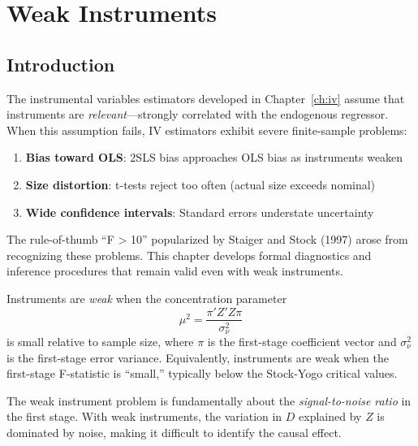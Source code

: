 
\chapter{Weak Instruments}
\label{ch:weak_iv}

\section{Introduction}
\label{sec:weak_iv_intro}

The instrumental variables estimators developed in Chapter~\ref{ch:iv} assume that instruments are \emph{relevant}---strongly correlated with the endogenous regressor. When this assumption fails, IV estimators exhibit severe finite-sample problems:

\begin{enumerate}
    \item \textbf{Bias toward OLS}: 2SLS bias approaches OLS bias as instruments weaken
    \item \textbf{Size distortion}: t-tests reject too often (actual size exceeds nominal)
    \item \textbf{Wide confidence intervals}: Standard errors understate uncertainty
\end{enumerate}

The rule-of-thumb ``F > 10'' popularized by Staiger and Stock (1997) arose from recognizing these problems. This chapter develops formal diagnostics and inference procedures that remain valid even with weak instruments.

\begin{definition}
\label{def:weak_iv}
Instruments are \emph{weak} when the concentration parameter
\[
\mu^2 = \frac{\pi'Z'Z\pi}{\sigma^2_\nu}
\]
is small relative to sample size, where $\pi$ is the first-stage coefficient vector and $\sigma^2_\nu$ is the first-stage error variance. Equivalently, instruments are weak when the first-stage F-statistic is ``small,'' typically below the Stock-Yogo critical values.
\end{definition}

\begin{insight}
The weak instrument problem is fundamentally about the \emph{signal-to-noise ratio} in the first stage. With weak instruments, the variation in $D$ explained by $Z$ is dominated by noise, making it difficult to identify the causal effect.
\end{insight}

